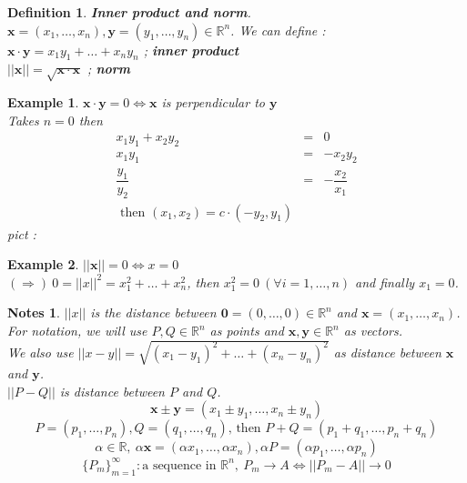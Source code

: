 \documentclass[a4paper,10pt]{article}
\newtheorem{defi}{Definition}
\newtheorem{ex}{Example}
\newtheorem{note}{Notes}
\newcommand{\R}{\mathbb{R}}
\newcommand{\bx}{\mathbf{x}}
\newcommand{\by}{\mathbf{y}}
\begin{document}
\begin{defi}
	\textbf{Inner product and norm}.\\
	$ \bx = (x_{1}, \dots, x_{n}) , \by = (y_{1}, \dots, y_{n}  ) \in \R^n $. We can define : \\
	$ \bx \cdot \by = x_{1}y_{1} + \dots + x_{n}y_{n} $ ; \textbf{inner product}\\
	$ || \bx ||= \sqrt{\bx \cdot \bx} $ ; \textbf{norm}
\end{defi}

\begin{ex}
	$ \bx \cdot \by =0 \Leftrightarrow \bx $ is perpendicular to $ \by $\\
	Takes $ n=0 $ then
	\begin{eqnarray} \nonumber
	x_{1}y_{1} + x_{2}y_{2} &=& 0 \\ \nonumber
	x_{1}y_{1} &=& -x_{2}y_{2} \\ \nonumber
	\dfrac{y_{1}}{y_{2}} &=& - \dfrac{x_{2}}{x_{1}}\\ \nonumber
	\text{ then } (x_{1},x_{2}) = c \cdot(-y_{2},y_{1})
	\end{eqnarray}
	pict : 
\end{ex}

\begin{ex}
	$ ||\bx||=0 \Leftrightarrow x=0$\\
	$ (\Rightarrow) \ 0 = || x ||^2 = x_{1}^2 + \dots + x_{n}^2 $, then $ x_{1}^2 =0 \ (\forall i =1, \dots, n )$ and finally $ x_{1}=0 $.
\end{ex}

\begin{note}
	$ || x || $ is the distance between $ \mathbf{0} = (0, \dots, 0) \in \R^n $ and $ \bx= (x_{1}, \dots, x_{n}) $.\\
	For notation, we will use $ P,Q \in \R^n $ as points and  $ \bx, \by \in \R^n $ as vectors. \\
	We also use $ || x-y || = \sqrt{(x_{1}-y_{1})^2 + \dots + (x_{n}-y_{n})^2} $ as distance between $ \bx $ and $ \by $. \\
	$ || P-Q || $ is distance between $ P $ and $ Q $.
	\[ \bx \pm \by = ( x_{1} \pm y_{1} , \dots, x_{n} \pm y_{n} ) \]
	\[ P=(p_{1}, \dots, p_{n}) ,  Q = (q_{1}, \dots, q_{n})  \text{, then } P+Q = (p_{1}+q_{1}, \dots, p_{n}+q_{n}) \]
	\[ \alpha \in \R, \ \alpha\bx = (\alpha x_{1}, \dots, \alpha x_{n}),  \alpha P = (\alpha p_{1}, \dots, \alpha p_{n})\]
	\[  \{P_{m}\}_{m=1}^{\infty} : \text{a sequence in } \R^n , \ P_{m} \rightarrow A \Leftrightarrow || P_{m}-A || \rightarrow 0 \]
\end{note}
\end{document}
